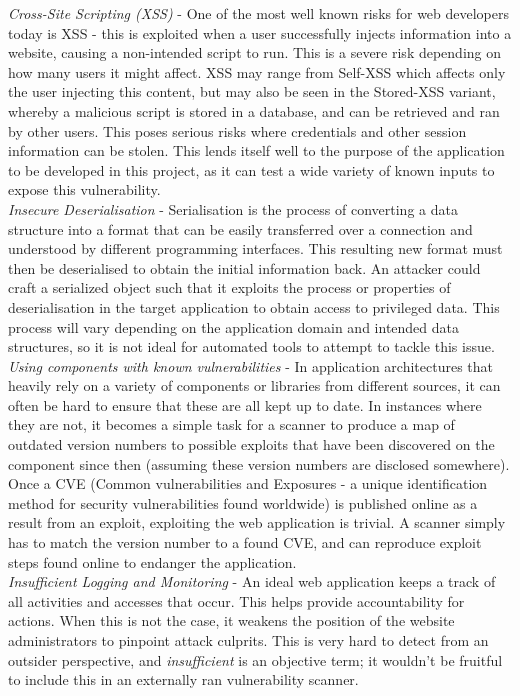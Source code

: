 	\emph{Cross-Site Scripting (XSS)} - One of the most well known risks for web developers today is XSS - this is exploited when a user successfully injects information into a website, causing a non-intended script to run. This is a severe risk depending on how many users it might affect. XSS may range from Self-XSS which affects only the user injecting this content, but may also be seen in the Stored-XSS variant, whereby a malicious script is stored in a database, and can be retrieved and ran by other users. This poses serious risks where credentials and other session information can be stolen. This lends itself well to the purpose of the application to be developed in this project, as it can test a wide variety of known inputs to expose this vulnerability. \\
	
	\emph{Insecure Deserialisation} - Serialisation is the process of converting a data structure into a format that can be easily transferred over a connection and understood by different programming interfaces. This resulting new format must then be deserialised to obtain the initial information back. An attacker could craft a serialized object such that it exploits the process or properties of deserialisation in the target application to obtain access to privileged data. This process will vary depending on the application domain and intended data structures, so it is not ideal for automated tools to attempt to tackle this issue.  \\ 
	
	\emph{Using components with known vulnerabilities} - In application architectures that heavily rely on a variety of components or libraries from different sources, it can often be hard to ensure that these are all kept up to date. In instances where they are not, it becomes a simple task for a scanner to produce a map of outdated version numbers to possible exploits that have been discovered on the component since then (assuming these version numbers are disclosed somewhere). Once a CVE (Common vulnerabilities and Exposures - a unique identification method for security vulnerabilities found worldwide) is published online as a result from an exploit, exploiting the web application is trivial. A scanner simply has to match the version number to a found CVE, and can reproduce exploit steps found online to endanger the application. \\ 
	
	\emph{Insufficient Logging and Monitoring} - An ideal web application keeps a track of all activities and accesses that occur. This helps provide accountability for actions. When this is not the case, it weakens the position of the website administrators to pinpoint attack culprits. This is very hard to detect from an outsider perspective, and \textit{insufficient} is an objective term; it wouldn't be fruitful to include this in an externally ran vulnerability scanner. \\
	
